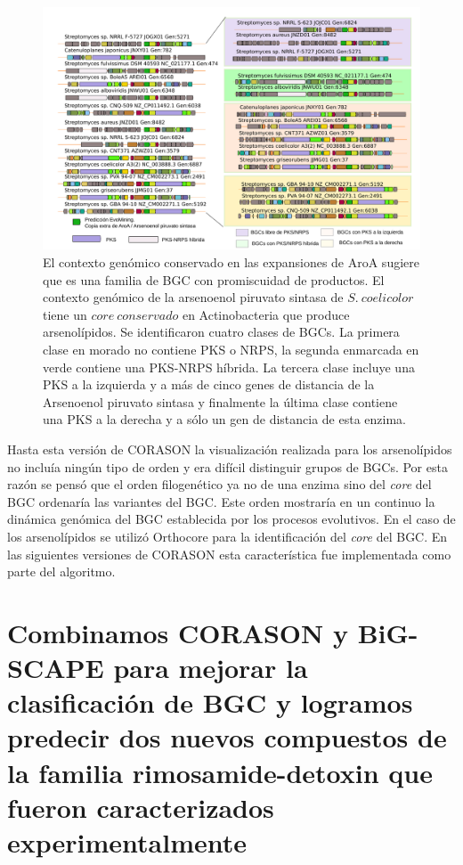 \documentclass[12pt,twoside]{reedthesis}
\begin{document}
  \begin{figure}[h!tbp]
  \centering
  \includegraphics[angle = 0,scale = .4]{chapter3/Coelicolor.pdf}
  \caption[EvoMining Algorithm]{\footnotesize{El contexto genómico conservado en las expansiones de AroA sugiere que es una familia de BGC con promiscuidad de productos. El contexto genómico de la arsenoenol piruvato sintasa de $S.~coelicolor$ tiene un $core~conservado$ en Actinobacteria que produce arsenolípidos. Se identificaron cuatro clases de BGCs. La primera clase en morado no contiene PKS o NRPS, la segunda enmarcada en verde contiene una PKS-NRPS híbrida. La tercera clase incluye una PKS a la izquierda y a más de cinco genes de distancia de la Arsenoenol piruvato sintasa y finalmente la última clase contiene una PKS a la derecha y a sólo un gen de distancia de esta enzima.}}
  \label{fig:Coelicolor}
  \end{figure}
  
  Hasta esta versión de CORASON la visualización realizada para los
  arsenolípidos no incluía ningún tipo de orden y era difícil distinguir
  grupos de BGCs. Por esta razón se pensó que el orden filogenético ya no
  de una enzima sino del \emph{core} del BGC ordenaría las variantes del
  BGC. Este orden mostraría en un continuo la dinámica genómica del BGC
  establecida por los procesos evolutivos. En el caso de los arsenolípidos
  se utilizó Orthocore para la identificación del \emph{core} del BGC. En
  las siguientes versiones de CORASON esta característica fue implementada
  como parte del algoritmo.
  
  \section{Combinamos CORASON y BiG-SCAPE para mejorar la clasificación de
  BGC y logramos predecir dos nuevos compuestos de la familia
  rimosamide-detoxin que fueron caracterizados
  experimentalmente}\label{combinamos-corason-y-big-scape-para-mejorar-la-clasificacion-de-bgc-y-logramos-predecir-dos-nuevos-compuestos-de-la-familia-rimosamide-detoxin-que-fueron-caracterizados-experimentalmente}
  
\end{document}
